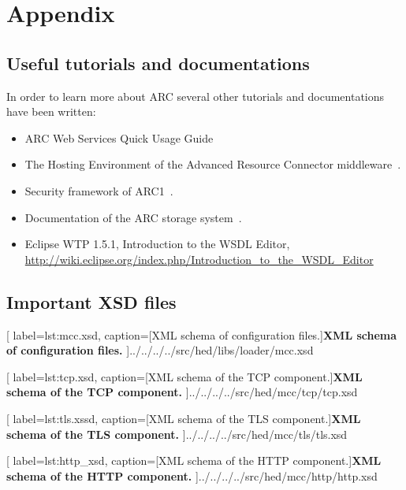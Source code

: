 \chapter{Appendix}

\section{Useful tutorials and documentations}

In order to learn more about ARC several other tutorials and documentations have been written:
\begin{itemize}
 \item ARC Web Services Quick Usage Guide~\cite{2008_UNKNOWN}
 \item The Hosting Environment of the Advanced Resource Connector middleware~\cite{2008_Cameron}.
 \item Security framework of ARC1~\cite{QIANG_2008}.
 \item Documentation of the ARC storage system~\cite{Nagy_2008}.
 \item Eclipse WTP 1.5.1, Introduction to the WSDL Editor, \url{http://wiki.eclipse.org/index.php/Introduction_to_the_WSDL_Editor}


\end{itemize}




\section{Important XSD files}\label{sec:impXSD}


	[
	label=lst:mcc.xsd,
	caption={[XML schema of configuration files.]\textbf{XML schema of configuration files.}}
	]{../../../../src/hed/libs/loader/mcc.xsd}


	[
	label=lst:tcp.xsd,
	caption={[XML schema of the TCP component.]\textbf{XML schema of the TCP component.}}
	]{../../../../src/hed/mcc/tcp/tcp.xsd}


	[
	label=lst:tls.xssd,
	caption={[XML schema of the TLS component.]\textbf{XML schema of  the TLS component.}}
	]{../../../../src/hed/mcc/tls/tls.xsd}


	[
	label=lst:http_xsd,
	caption={[XML schema of the HTTP component.]\textbf{XML schema of the HTTP component.}}
	]{../../../../src/hed/mcc/http/http.xsd}









